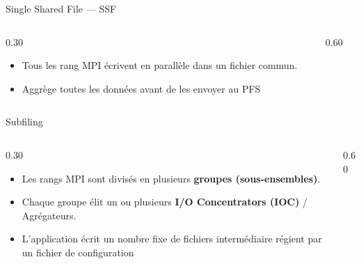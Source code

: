 \documentclass[svgnames,9pt,aspectratio=169]{beamer}
\begin{document}
\begin{frame}{Single Shared File --- SSF}
  \begin{columns}[t]
    \begin{column}{0.30\textwidth}      
        \begin{itemize}
          \item Tous les rang MPI écrivent en parallèle dans un fichier commun.
          \item Aggrège toutes les données avant de les envoyer au PFS
        \end{itemize}
    \end{column}

    \begin{column}{0.60\textwidth}
      \begin{center}
        
      \end{center}
    \end{column}
  \end{columns}
\end{frame}

\begin{frame}{Subfiling}
  \begin{columns}[t]
    \begin{column}{0.30\textwidth}
      \begin{itemize}
        \item Les rangs MPI sont divisés en plusieurs \textbf{groupes (sous-ensembles)}.
        \item Chaque groupe élit un ou plusieurs \textbf{I/O Concentrators (IOC)} / Agrégateurs.
        \item L'application écrit un nombre fixe de fichiers intermédiaire régient par un fichier de configuration
      \end{itemize}
    \end{column}

    \begin{column}{0.60\textwidth}
      \begin{center}
        
      \end{center}
    \end{column}
  \end{columns}
\end{frame}
\end{document}
